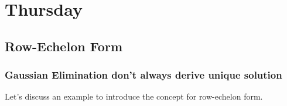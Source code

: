 

\section{Thursday}

\subsection{Row-Echelon Form}
\subsubsection{Gaussian Elimination don't always derive unique solution}
Let's discuss an example to introduce the concept for row-echelon form.
